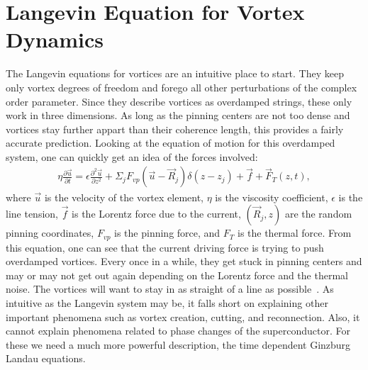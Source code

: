 \section{Langevin Equation for Vortex Dynamics}
The Langevin equations for vortices are an intuitive place to start. They keep only vortex degrees of freedom and forego all other perturbations of the complex order parameter. Since they describe vortices as overdamped strings, these only work in three dimensions. As long as the pinning centers are not too dense and vortices stay further appart than their coherence length, this provides a fairly accurate prediction. Looking at the equation of motion for this overdamped system, one can quickly get an idea of the forces involved:
\begin{eqnarray}
\eta \frac {\partial \overrightarrow u}{\partial t} = \epsilon \frac {\partial^2 \overrightarrow u} {\partial z^2 } + \Sigma_j F_{vp} (\overrightarrow u - \overrightarrow R_j) \delta(z - z_j) + \overrightarrow f + \overrightarrow F_T(z,t), 
\label{Langevin}
\end{eqnarray}
where $\overrightarrow u$ is the velocity of the vortex element, $\eta$ is the viscosity coefficient, $\epsilon$ is the line tension, $\overrightarrow f$ is the Lorentz force due to the current, $(\overrightarrow R_j,z)$ are the random pinning coordinates, $F_{vp}$ is the pinning force, and $F_T$ is the thermal force. From this equation, one can see that the current driving force is trying to push overdamped vortices. Every once in a while, they get stuck in pinning centers and may or may not get out again depending on the Lorentz force and the thermal noise. The vortices will want to stay in as straight of a line as possible~\cite{Kwok16}. As intuitive as the Langevin system may be, it falls short on explaining other important phenomena such as vortex creation, cutting, and reconnection. Also, it cannot explain phenomena related to phase changes of the superconductor. For these we need a much more powerful description, the time dependent Ginzburg Landau equations. 


